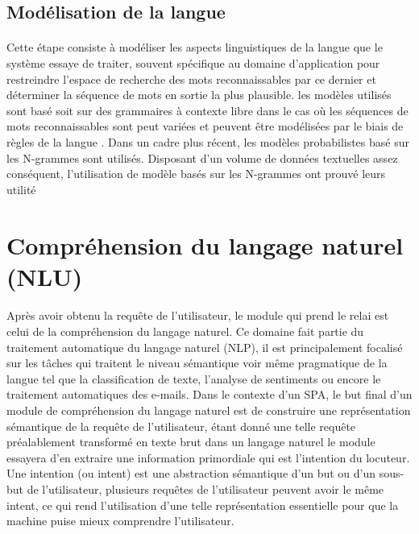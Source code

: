 	\subsection{Modélisation de la langue}
		\paragraph{}
		Cette étape consiste à modéliser les aspects linguistiques de la langue que le système essaye de traiter, souvent spécifique au domaine d'application pour restreindre l'espace de recherche des mots reconnaissables par ce dernier et déterminer la séquence de mots en sortie la plus plausible. les modèles utilisés sont basé soit sur des grammaires à contexte libre dans le cas où les séquences de mots reconnaissables sont peut variées et peuvent être modélisées par le biais de règles de la langue \cite{LM_grammar}. Dans un cadre plus récent, les modèles probabilistes basé sur les N-grammes sont utilisés. Disposant d'un volume de données textuelles assez conséquent, l'utilisation de modèle basés sur les N-grammes ont prouvé leurs utilité \cite{nlp_ngrams,speech_reco_Yu2015,LM_n-grams}
		
		
\section{Compréhension du langage naturel (NLU)}
	\paragraph{}
	Après avoir obtenu la requête de l'utilisateur, le module qui prend le relai est celui de la compréhension du langage naturel. Ce domaine fait partie du traitement automatique du langage naturel (NLP), il est principalement focalisé sur les tâches qui traitent le niveau sémantique voir même pragmatique de la langue tel que la classification de texte, l'analyse de sentiments ou encore le traitement automatiques des e-mails. Dans le contexte d'un SPA, le but final d'un module de compréhension du langage naturel est de construire une représentation sémantique de la requête de l'utilisateur, étant donné une telle requête préalablement transformé en texte brut dans un langage naturel le module essayera d'en extraire une information primordiale qui est l'intention du locuteur. Une intention (ou intent) est une abstraction sémantique d'un but ou d'un sous-but de l'utilisateur, plusieurs requêtes de l'utilisateur peuvent avoir le même intent, ce qui rend l'utilisation d'une telle représentation essentielle pour que la machine puise mieux comprendre l'utilisateur.
